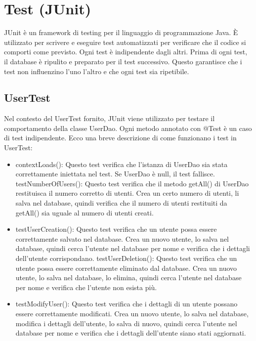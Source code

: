 \documentclass[twoside,openright,titlepage,fleqn,headinclude,12pt,a4paper,BCOR=5mm,footinclude]{scrbook}
\begin{document}
\chapter{Test (JUnit) }
JUnit è un framework di testing per il linguaggio di programmazione Java. È utilizzato per scrivere e eseguire test automatizzati per verificare che il codice si comporti come previsto. Ogni test è indipendente dagli altri. Prima di ogni test, il database è ripulito e preparato per il test successivo. Questo garantisce che i test non influenzino l'uno l'altro e che ogni test sia ripetibile.

\section{UserTest}
Nel contesto del UserTest fornito, JUnit viene utilizzato per testare il comportamento della classe UserDao. Ogni metodo annotato con @Test è un caso di test indipendente.  Ecco una breve descrizione di come funzionano i test in UserTest: 

\begin{itemize}   
    \item contextLoads(): Questo test verifica che l'istanza di UserDao sia stata correttamente iniettata nel test. Se UserDao è null, il test fallisce.  
    testNumberOfUsers(): Questo test verifica che il metodo getAll() di UserDao restituisca il numero corretto di utenti. Crea un certo numero di utenti, li salva nel database, quindi verifica che il numero di utenti restituiti da getAll() sia uguale al numero di utenti creati.  
    \item testUserCreation(): Questo test verifica che un utente possa essere correttamente salvato nel database. Crea un nuovo utente, lo salva nel database, quindi cerca l'utente nel database per nome e verifica che i dettagli dell'utente corrispondano.  
    testUserDeletion(): Questo test verifica che un utente possa essere correttamente eliminato dal database. Crea un nuovo utente, lo salva nel database, lo elimina, quindi cerca l'utente nel database per nome e verifica che l'utente non esista più.  
    \item testModifyUser(): Questo test verifica che i dettagli di un utente possano essere correttamente modificati. Crea un nuovo utente, lo salva nel database, modifica i dettagli dell'utente, lo salva di nuovo, quindi cerca l'utente nel database per nome e verifica che i dettagli dell'utente siano stati aggiornati. 
\end{itemize}
\end{document}
